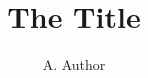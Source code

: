 \documentclass[epjc3]{svjour3}
\begin{document}
\title{The Title}
\author{A. Author}
\maketitle
\epjextra
\end{document}

